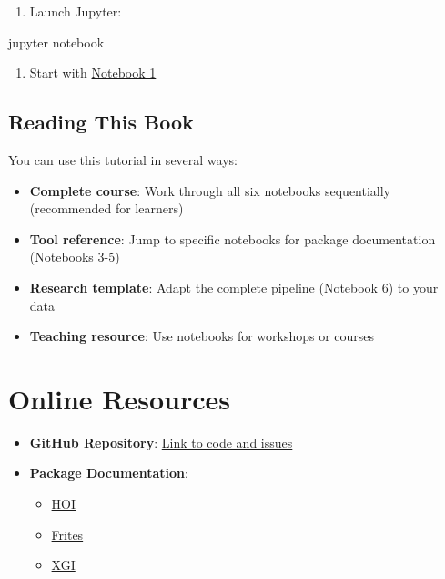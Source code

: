 \documentclass[
  11pt,
  letterpaper,
  oneside,
  openany]{book}
\newenvironment{Shaded}{\begin{snugshade}}{\end{snugshade}}
\newcommand{\ExtensionTok}[1]{\textcolor[rgb]{0.00,0.23,0.31}{#1}}
\newcommand{\NormalTok}[1]{\textcolor[rgb]{0.00,0.23,0.31}{#1}}
\providecommand{\tightlist}{%
  \setlength{\itemsep}{0pt}\setlength{\parskip}{0pt}}
\begin{document}
\begin{enumerate}
\def\labelenumi{\arabic{enumi}.}
\setcounter{enumi}{2}
\tightlist
\item
  Launch Jupyter:
\end{enumerate}

\begin{Shaded}
\begin{Highlighting}[]
\ExtensionTok{jupyter}\NormalTok{ notebook}
\end{Highlighting}
\end{Shaded}

\begin{enumerate}
\def\labelenumi{\arabic{enumi}.}
\setcounter{enumi}{3}
\tightlist
\item
  Start with \href{01_information_theory_foundations.ipynb}{Notebook 1}
\end{enumerate}

\subsection*{Reading This Book}\label{reading-this-book}

You can use this tutorial in several ways:

\begin{itemize}
\tightlist
\item
  \textbf{Complete course}: Work through all six notebooks sequentially
  (recommended for learners)
\item
  \textbf{Tool reference}: Jump to specific notebooks for package
  documentation (Notebooks 3-5)
\item
  \textbf{Research template}: Adapt the complete pipeline (Notebook 6)
  to your data
\item
  \textbf{Teaching resource}: Use notebooks for workshops or courses
\end{itemize}

\section*{Online Resources}\label{online-resources}


\begin{itemize}
\tightlist
\item
  \textbf{GitHub Repository}:
  \href{https://github.com/yourusername/repo}{Link to code and issues}
\item
  \textbf{Package Documentation}:

  \begin{itemize}
  \tightlist
  \item
    \href{https://hoi.readthedocs.io/}{HOI}
  \item
    \href{https://brainets.github.io/frites/}{Frites}
  \item
    \href{https://xgi.readthedocs.io/}{XGI}
  \end{itemize}
\end{itemize}
\end{document}
